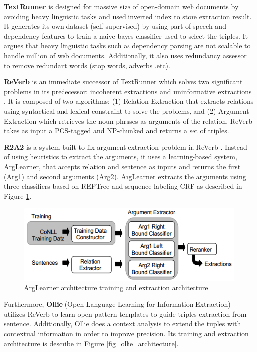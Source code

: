 \documentclass[conference,compsoc,12pt]{IEEEtran}
\begin{document}
\textbf{TextRunner} is designed for massive size of open-domain web documents by avoiding heavy linguistic tasks and used inverted index to store extraction result\cite{banko2007open}. It generates its own dataset (self-supervised) by using part of speech and dependency features to train a naive bayes classifier used to select the triples. It argues that heavy linguistic tasks such as dependency parsing are not scalable to handle million of web documents. Additionally, it also uses redundancy assessor to remove redundant words (stop words, adverbs .etc).

\textbf{ReVerb} is an immediate successor of TextRunner which solves two significant problems in its predecessor: incoherent extractions and uninformative extractions \cite{fader2011identifying}. It is composed of two algorithms: (1) Relation Extraction that extracts relations using syntactical and lexical constraint to solve the problems, and (2) Argument Extraction which retrieves the noun phrases as arguments of the relation. ReVerb takes as input a POS-tagged and NP-chunked and returns a set of triples.

\textbf{R2A2} is a system built to fix argument extraction problem in ReVerb \cite{etzioni2011open}. Instead of using heuristics to extract the arguments, it uses a learning-based system, ArgLearner, that accepts relation and sentence as inputs and returns the first (Arg1) and second arguments (Arg2). ArgLearner extracts the arguments using three classifiers based on REPTree and sequence labeling CRF as described in Figure \ref{fig_arglearner_architecture}.

\begin{figure}
\centering
\includegraphics[scale=0.5]{../images/arglearner_architecture.png}
\caption{ArgLearner architecture training and extraction architecture}
\label{fig_arglearner_architecture}
\end{figure}

Furthermore, \textbf{Ollie} (Open Language Learning for Information Extraction)\cite{schmitz2012open} utilizes ReVerb\cite{fader2011identifying} to learn open pattern templates to guide triples extraction from sentence. Additionally, Ollie does a context analysis to extend the tuples with contextual information in order to improve precision\cite{schmitz2012open}. Its training and extraction architecture is describe in Figure \ref{fig_ollie_architecture}.
\end{document}
